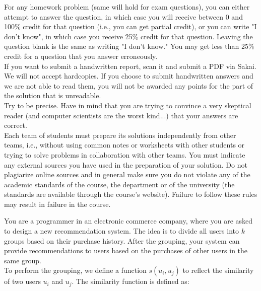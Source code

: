 \documentclass{article}
\begin{document}
 For any homework problem (same will hold
for exam questions), you can either attempt to answer the question, in
which case you will receive between 0 and 100\% credit for that
question (i.e., you can get partial credit), or you can write "I don't
know", in which case you receive 25\% credit for that question.
Leaving the question blank is the same as writing "I don't know." You
may get less than 25\% credit for a question that you answer
erroneously.\\

 If you want to submit a
handwritten report, scan it and submit a PDF via Sakai. We will not
accept hardcopies. If you choose to submit handwritten answers and we
are not able to read them, you will not be awarded any points for the
part of the solution that is unreadable.\\

 Try to be precise. Have in mind that you
are trying to convince a very skeptical reader (and computer
scientists are the worst kind...) that your answers are correct.\\

 Each team of students
must prepare its solutions independently from other teams, i.e.,
without using common notes or worksheets with other students or trying
to solve problems in collaboration with other teams.  You must
indicate any external sources you have used in the preparation of your
solution. Do not plagiarize online sources and in general make sure
you do not violate any of the academic standards of the course, the
department or of the university (the standards are available through
the course's website). Failure to follow these rules may result in
failure in the course.\\

\newpage

\vspace{0.1in}

{\bf }

 You are a programmer in an
electronic commerce company, where you are asked to design a new
recommendation system. The idea is to divide all users into $k$ groups
based on their purchase history. After the grouping, your system can
provide recommendations to users based on the purchases of other users
in the same group.\\

\noindent To perform the grouping, we define a function $s(u_i, u_j)$
to reflect the similarity of two users $u_i$ and $u_j$. The similarity
function is defined as: \vspace{-0.05in}
\end{document}
